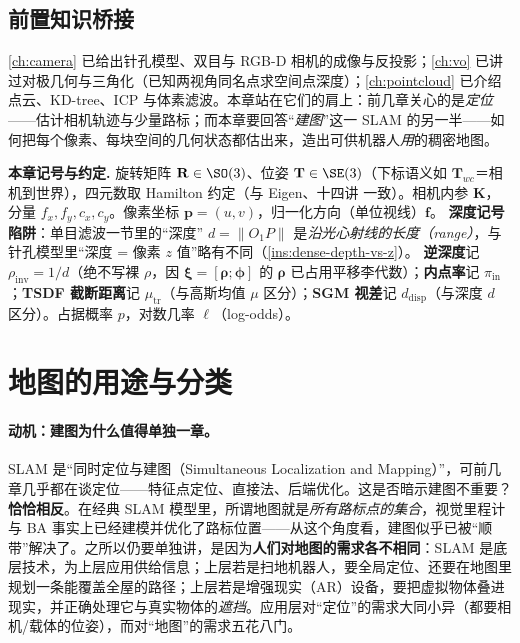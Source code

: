 \subsection*{前置知识桥接}
\cref{ch:camera} 已给出针孔模型、双目与 RGB-D 相机的成像与反投影；\cref{ch:vo} 已讲过对极几何与三角化（已知两视角同名点求空间点深度）；\cref{ch:pointcloud} 已介绍点云、KD-tree、ICP 与体素滤波。本章站在它们的肩上：前几章关心的是\emph{定位}——估计相机轨迹与少量路标；而本章要回答“\emph{建图}”这一 SLAM 的另一半——如何把每个像素、每块空间的几何状态都估出来，造出可供机器人\emph{用}的稠密地图。

\begin{note}
\textbf{本章记号与约定.}\;
旋转矩阵 $\mathbf{R}\in\SO(3)$、位姿 $\mathbf{T}\in\SE(3)$（下标语义如 $\mathbf{T}_{wc}$＝相机到世界），四元数取 Hamilton 约定（与 Eigen、十四讲\cite{gaoxiang2019slam14} 一致）。相机内参 $\mathbf{K}$，分量 $f_x,f_y,c_x,c_y$。像素坐标 $\mathbf{p}=(u,v)$，归一化方向（单位视线）$\mathbf{f}$。
\textbf{深度记号陷阱}：单目滤波一节里的“深度” $d=\|O_1P\|$ 是\emph{沿光心射线的长度（range）}，与针孔模型里“深度 = 像素 $z$ 值”略有不同（\cref{ins:dense-depth-vs-z}）。
\textbf{逆深度}记 $\rho_{\mathrm{inv}}=1/d$（绝不写裸 $\rho$，因 $\boldsymbol{\xi}=[\boldsymbol{\rho};\boldsymbol{\phi}]$ 的 $\boldsymbol{\rho}$ 已占用平移李代数）；\textbf{内点率}记 $\pi_{\mathrm{in}}$；\textbf{TSDF 截断距离}记 $\mu_{\mathrm{tr}}$（与高斯均值 $\mu$ 区分）；\textbf{SGM 视差}记 $d_{\mathrm{disp}}$（与深度 $d$ 区分）。占据概率 $p$，对数几率 $\ell$（log-odds）。
\end{note}

\section{地图的用途与分类}
\label{sec:dense-intro}

\paragraph{动机：建图为什么值得单独一章。}
SLAM 是“同时定位与建图（Simultaneous Localization and Mapping）”，可前几章几乎都在谈定位——特征点定位、直接法、后端优化。这是否暗示建图不重要？\textbf{恰恰相反}。在经典 SLAM 模型里，所谓地图就是\emph{所有路标点的集合}，视觉里程计与 BA 事实上已经建模并优化了路标位置——从这个角度看，建图似乎已被“顺带”解决了\cite{gaoxiang2019slam14}。之所以仍要单独讲，是因为\textbf{人们对地图的需求各不相同}：SLAM 是底层技术，为上层应用供给信息；上层若是扫地机器人，要全局定位、还要在地图里规划一条能覆盖全屋的路径；上层若是增强现实（AR）设备，要把虚拟物体叠进现实，并正确处理它与真实物体的\emph{遮挡}。应用层对“定位”的需求大同小异（都要相机/载体的位姿），而对“地图”的需求五花八门。

